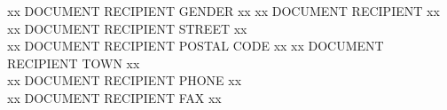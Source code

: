 \documentclass[12pt]{lettre} %
\begin{document}
\begin{letter}{%
    xx DOCUMENT RECIPIENT GENDER xx xx DOCUMENT RECIPIENT xx \\
    xx DOCUMENT RECIPIENT STREET xx\\
    xx DOCUMENT RECIPIENT POSTAL CODE xx xx DOCUMENT RECIPIENT TOWN xx\\
    xx DOCUMENT RECIPIENT PHONE xx\\
    xx DOCUMENT RECIPIENT FAX xx
                                                                               
}
\address{%
  xx DOCUMENT AUTHOR GENDER xx xx DOCUMENT AUTHOR xx\\
  xx DOCUMENT AUTHOR STREET xx\\            
  xx DOCUMENT AUTHOR POSTAL CODE xx xx DOCUMENT AUTHOR TOWN xx}
                                     
                                      
\signature{xx DOCUMENT AUTHOR xx}

\pagestyle{empty}
                                                                                          
                               
\opening{}

\closing{}
\end{letter}
\end{document}
